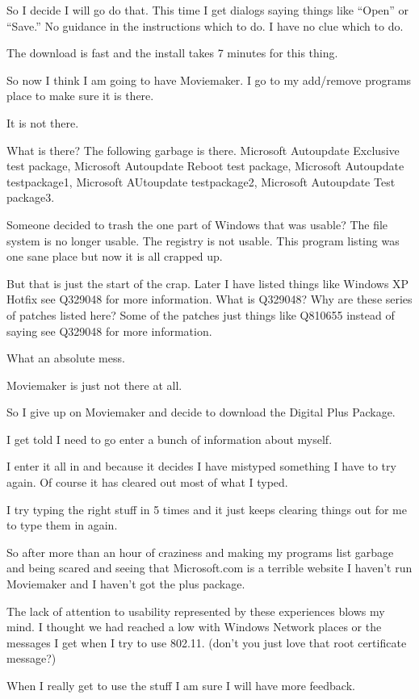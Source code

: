 \documentclass[12pt,letterpaper]{article}
\begin{document}
So I decide I will go do that.
This time I get dialogs saying things like ``Open'' or ``Save.''
No guidance in the instructions which to do.
I have no clue which to do.

The download is fast and the install takes 7 minutes for this thing.

So now I think I am going to have Moviemaker.
I go to my add/remove programs place to make sure it is there.

It is not there.

What is there? The following garbage is there.
Microsoft Autoupdate Exclusive test package, Microsoft Autoupdate Reboot test package,
Microsoft Autoupdate testpackage1, Microsoft AUtoupdate testpackage2,
Microsoft Autoupdate Test package3.

Someone decided to trash the one part of Windows that was usable?
The file system is no longer usable. The registry is not usable.
This program listing was one sane place but now it is all crapped up.

But that is just the start of the crap.
Later I have listed things like Windows XP Hotfix see Q329048 for more information.
What is Q329048? Why are these series of patches listed here?
Some of the patches just things like Q810655 instead of saying see Q329048
for more information.

What an absolute mess.

Moviemaker is just not there at all.

So I give up on Moviemaker and decide to download the Digital Plus Package.

I get told I need to go enter a bunch of information about myself.

I enter it all in and because it decides I have mistyped something I have to try again.
Of course it has cleared out most of what I typed.

I try typing the right stuff in 5 times and it just keeps clearing things out
for me to type them in again.

So after more than an hour of craziness and making my programs list garbage
and being scared and seeing that Microsoft.com is a terrible website I haven't
run Moviemaker and I haven't got the plus package.

The lack of attention to usability represented by these experiences blows my mind.
I thought we had reached a low with Windows Network places or the messages I
get when I try to use 802.11. (don't you just love that root certificate message?)

When I really get to use the stuff I am sure I will have more feedback.
\end{document}
